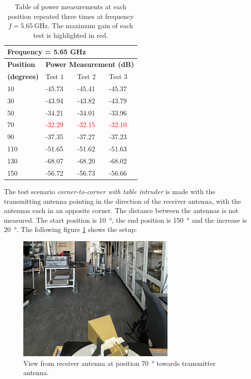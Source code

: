 \begin{table}[H]
    \centering
    \begin{tabular}{l|l|l|l}
        \multicolumn{4}{l}{\textbf{Frequency = 5.65 GHz}}         \\
        \hline
        \textbf{Position} & \multicolumn{3}{l}{\textbf{Power Measurement (dB)}} \\
        \textbf{(degrees)}  & Test 1    & Test 2  & Test 3  \\
        \hline
        \hline
        10      & -45.73    & -45.41    & -45.37 \\
        30      & -43.94    & -43.82    & -43.79 \\
        50      & -34.21    & -34.01    & -33.96 \\
        70      & \textcolor{red}{-32.29}    & \textcolor{red}{-32.15}    & \textcolor{red}{-32.10} \\
        90      & -37.35    & -37.27    & -37.23 \\
        110     & -51.65    & -51.62    & -51.63 \\
        130     & -68.07    & -68.20    & -68.02 \\
        150     & -56.72    & -56.73    & -56.66
        \end{tabular}
    \caption{Table of power measurements at each position repeated three times at frequency $f=\SI{5.65}{\giga\hertz}$. The maximum gain of each test is highlighted in red.}
    \label{tab:a2_2b}
\end{table}

The test scenario \textit{corner-to-corner with table intruder} is made with the transmitting antenna pointing in the direction of the receiver antenna, with the antennas each in an opposite corner. The distance between the antennas is not measured. The start position is \SI{10}{\degree}, the end position is \SI{150}{\degree} and the increase is \SI{20}{\degree}. The following figure \ref{fig:a2_4} shows the setup:
\begin{figure}[H]
    \centering
    \includegraphics[width=0.7\textwidth]{figures/test_intruder_table.JPG}
    \caption{View from receiver antenna at position \SI{70}{\degree} towards transmitter antenna.} \label{fig:a2_4}
\end{figure}

